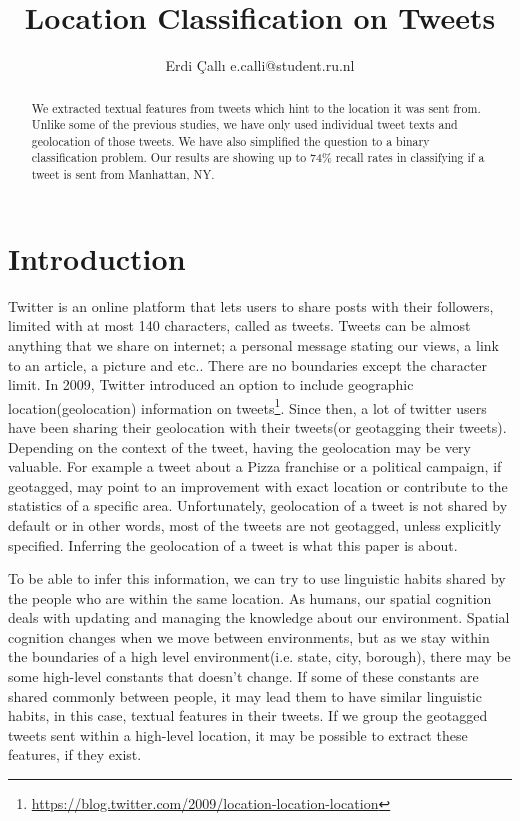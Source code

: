 \documentclass[twoside,11pt]{article}
\begin{document}
\title{Location Classification on Tweets}
\author{\name Erdi \c{C}all{\i}  \email e.calli@student.ru.nl}
\maketitle
\begin{abstract}

We extracted textual features from tweets which hint to the location it was sent from. Unlike some of the previous studies, we have only used individual tweet texts and geolocation of those tweets. We have also simplified the question to a binary classification problem. Our results are showing up to 74\% recall rates in classifying if a tweet is sent from Manhattan, NY.

\end{abstract}


\section{Introduction}

Twitter is an online platform that lets users to share posts with their followers, limited with at most 140 characters, called as tweets. Tweets can be almost anything that we share on internet; a personal message stating our views, a link to an article, a picture and etc.. There are no boundaries except the character limit. In 2009, Twitter introduced an option to include geographic location(geolocation) information on tweets\footnote{\url{https://blog.twitter.com/2009/location-location-location}}. Since then, a lot of twitter users have been sharing their geolocation with their tweets(or geotagging their tweets). Depending on the context of the tweet, having the geolocation may be very valuable. For example a tweet about a Pizza franchise or a political campaign, if geotagged, may point to an improvement with exact location or contribute to the statistics of a specific area. Unfortunately, geolocation of a tweet is not shared by default or in other words, most of the tweets are not geotagged, unless explicitly specified. Inferring the geolocation of a tweet is what this paper is about.

To be able to infer this information, we can try to use linguistic habits shared by the people who are within the same location. As humans, our spatial cognition deals with updating and managing the knowledge about our environment. Spatial cognition changes when we move between environments, but as we stay within the boundaries of a high level environment(i.e. state, city, borough), there may be some high-level constants that doesn't change. If some of these constants are shared commonly between people, it may lead them to have similar linguistic habits, in this case, textual features in their tweets. If we group the geotagged tweets sent within a high-level location, it may be possible to extract these features, if they exist.
\end{document}
